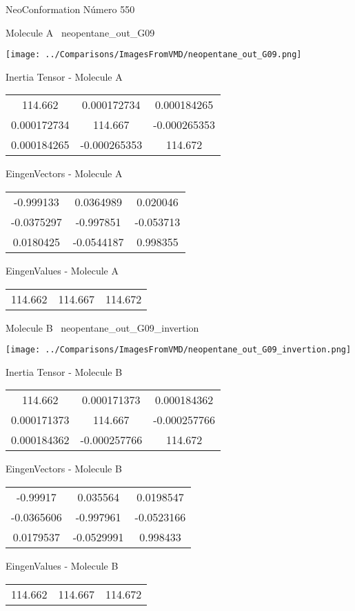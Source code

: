 \vtab[-3cm]
\begin{center}
{\large NeoConformation \tab Número 550}
\end{center}
\begin{multicols}{2}
\begin{center}

Molecule A \
neopentane\_out\_G09

\texttt{[image: ../Comparisons/ImagesFromVMD/neopentane\_out\_G09.png]}

Inertia Tensor - Molecule A \\
\begin{tabular}{|c c c|}
114.662	 & 	0.000172734	 & 	0.000184265	 \\
0.000172734	 & 	114.667	 & 	-0.000265353	 \\
0.000184265	 & 	-0.000265353	 & 	114.672
\end{tabular}

\vtab
 EingenVectors - Molecule A     \\
\begin{tabular}{|c c c|}
-0.999133	 & 	0.0364989	 & 	0.020046	 \\
-0.0375297	 & 	-0.997851	 & 	-0.053713	 \\
0.0180425	 & 	-0.0544187	 & 	0.998355
\end{tabular}

\vtab
 EingenValues - Molecule A     \\
\begin{tabular}{|c c c|}
114.662	 & 	114.667	 & 	114.672	 \\
\end{tabular}
\columnbreak

Molecule B \
neopentane\_out\_G09\_invertion

\texttt{[image: ../Comparisons/ImagesFromVMD/neopentane\_out\_G09\_invertion.png]}

Inertia Tensor - Molecule B \\
\begin{tabular}{|c c c|}
114.662	 & 	0.000171373	 & 	0.000184362	 \\
0.000171373	 & 	114.667	 & 	-0.000257766	 \\
0.000184362	 & 	-0.000257766	 & 	114.672
\end{tabular}

\vtab
 EingenVectors - Molecule B     \\
\begin{tabular}{|c c c|}
-0.99917	 & 	0.035564	 & 	0.0198547	 \\
-0.0365606	 & 	-0.997961	 & 	-0.0523166	 \\
0.0179537	 & 	-0.0529991	 & 	0.998433
\end{tabular}

\vtab
 EingenValues - Molecule B     \\
\begin{tabular}{|c c c|}
114.662	 & 	114.667	 & 	114.672	 \\
\end{tabular}

\end{center}
\end{multicols}

